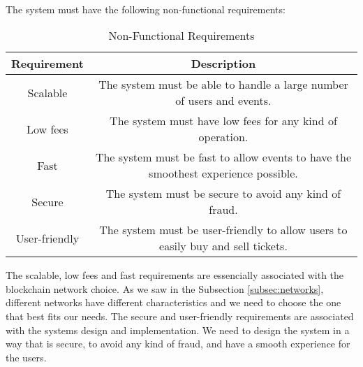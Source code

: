 ~

The system must have the following non-functional requirements:

\begin{table}[H]
    \caption{Non-Functional Requirements}
    \label{tab:non_functional_requirements}
    \begin{tabular}{|c|c|}
        \hline
        \textbf{Requirement} & \textbf{Description}                                                               \\
        \hline
        Scalable             & The system must be able to handle a large number of users and events.              \\
        \hline
        Low fees             & The system must have low fees for any kind of operation.                           \\
        \hline
        Fast                 & The system must be fast to allow events to have the smoothest experience possible. \\
        \hline
        Secure               & The system must be secure to avoid any kind of fraud.                              \\
        \hline
        User-friendly        & The system must be user-friendly to allow users to easily buy and sell tickets.    \\
        \hline
    \end{tabular}
\end{table}

The scalable, low fees and fast requirements are essencially associated with the blockchain network choice. As we saw in the Subsection \ref{subsec:networks}, different networks have different characteristics and we need to choose the one that best fits our needs.
The secure and user-friendly requirements are associated with the systems design and implementation. We need to design the system in a way that is secure, to avoid any kind of fraud, and have a smooth experience for the users.
